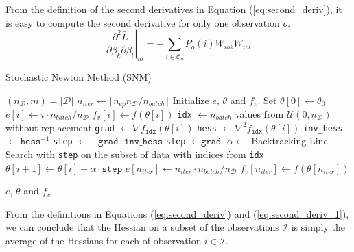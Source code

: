 \documentclass[conference]{IEEEtran}
\let\oldReturn\Return
\renewcommand{\Return}{\State\oldReturn}
\begin{document}
From the definition of the second derivatives in Equation (\ref{eq:second_deriv}), it is easy to compute the second derivative for only one observation $o$.
\begin{equation}
\label{eq:second_deriv_1}
\left.\frac{\partial^2 \bar{L}}{\partial \beta_k \partial \beta_l}\right|_{m} = - \sum_{i\in\mathcal{C}_o} P_o(i) W_{iok} W_{iol}
\end{equation}

\begin{algorithm*}[t]
\caption{Stochastic Newton Method (SNM)}\label{algo:snm}
\begin{algorithmic}[1]
\State $(n_{\mathcal{D}}, m) = |\mathcal{D}|$ 
\State $n_{iter} \gets \lceil n_{ep}n_{\mathcal{D}}/n_{batch} \rceil$ 
\State Initialize $e$, $\theta$ and $f_v$. Set $\theta[0] \gets \theta_{0}$
\State $e[i] \gets i\cdot n_{batch} /n_{\mathcal{D}}$ 
\State $f_{v}[i] \gets f(\theta[i])$ 
\State \texttt{idx} $\gets n_{batch} $ values from $\mathcal{U}(0, n_{\mathcal{D}})$ without replacement
\State \texttt{grad} $\gets \nabla f_{\texttt{idx}}(\theta[i])$ 
\State \texttt{hess} $\gets \nabla^2 f_{\texttt{idx}}(\theta[i])$ 
\State \texttt{inv\_hess} $\gets \texttt{hess}^{-1}$
\State \texttt{step} $\gets -\texttt{grad} \cdot \texttt{inv\_hess}$
\Else 
\State \texttt{step} $\gets \texttt{grad}$
\EndIf
\State $\alpha \gets $ Backtracking Line Search with \texttt{step} on the subset of data  with indices from \texttt{idx}
\State $\theta[i+1] \gets \theta[i] + \alpha \cdot \texttt{step}$
\EndFor
\State $e[n_{iter}] \gets n_{iter}\cdot n_{batch} /n_{\mathcal{D}}$
\State $f_{v}[n_{iter}] \gets f(\theta[n_{iter}])$

\Return $e$, $\theta$ and $f_v$
\EndFunction
\end{algorithmic}
\end{algorithm*}

From the definitions in Equations (\ref{eq:second_deriv}) and (\ref{eq:second_deriv_1}), we can conclude that the Hessian on a subset of the observations $\mathcal{I}$ is simply the average of the Hessians for each of observation $i\in\mathcal{I}$. \\
\end{document}
